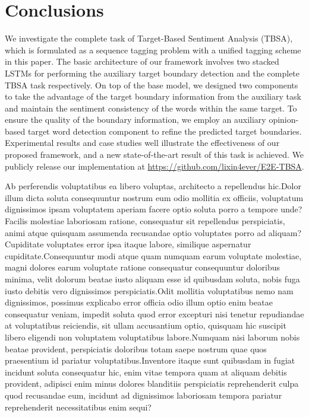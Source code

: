 \documentclass[letterpaper]{article}
\begin{document}
\section{Conclusions}
We investigate the complete task of Target-Based Sentiment Analysis (TBSA), which is formulated as a sequence tagging problem with a unified tagging scheme in this paper. The basic architecture of our framework involves two stacked LSTMs for performing the auxiliary target boundary detection and the complete TBSA task respectively. On top of the base model, we designed two components to take the advantage of the target boundary information from the auxiliary task and maintain the sentiment consistency of the words within the same target. To ensure the quality of the boundary information, we employ an auxiliary opinion-based target word detection component to refine the predicted target boundaries. Experimental results and case studies well illustrate the effectiveness of our proposed framework, and a new state-of-the-art result of this task is achieved. We publicly release our implementation at \url{https://github.com/lixin4ever/E2E-TBSA}.


Ab perferendis voluptatibus ea libero voluptas, architecto a repellendus hic.Dolor illum dicta soluta consequuntur nostrum eum odio mollitia ex officiis, voluptatum dignissimos ipsam voluptatem aperiam facere optio soluta porro a tempore unde?Facilis molestiae laboriosam ratione, consequatur sit repellendus perspiciatis, animi atque quisquam assumenda recusandae optio voluptates porro ad aliquam?Cupiditate voluptates error ipsa itaque labore, similique aspernatur cupiditate.Consequuntur modi atque quam numquam earum voluptate molestiae, magni dolores earum voluptate ratione consequatur consequuntur doloribus minima, velit dolorum beatae iusto aliquam esse id quibusdam soluta, nobis fuga iusto debitis vero dignissimos perspiciatis.Odit mollitia voluptatibus nemo nam dignissimos, possimus explicabo error officia odio illum optio enim beatae consequatur veniam, impedit soluta quod error excepturi nisi tenetur repudiandae at voluptatibus reiciendis, sit ullam accusantium optio, quisquam hic suscipit libero eligendi non voluptatem voluptatibus labore.Numquam nisi laborum nobis beatae provident, perspiciatis doloribus totam saepe nostrum quae quos praesentium id pariatur voluptatibus.Inventore itaque sunt quibusdam in fugiat incidunt soluta consequatur hic, enim vitae tempora quam at aliquam debitis provident, adipisci enim minus dolores blanditiis perspiciatis reprehenderit culpa quod recusandae eum, incidunt ad dignissimos laboriosam tempora pariatur reprehenderit necessitatibus enim sequi?\clearpage

\end{document}
